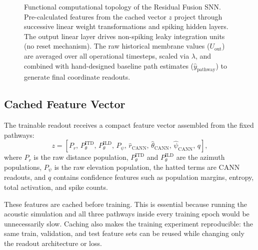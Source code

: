 \begin{figure}[htbp]
    \caption{Functional computational topology of the Residual Fusion SNN. Pre-calculated features from the cached vector $z$ project through successive linear weight transformations and spiking hidden layers. The output linear layer drives non-spiking leaky integration units (no reset mechanism). The raw historical membrane values ($U_{\text{out}}$) are averaged over all operational timesteps, scaled via $\lambda$, and combined with hand-designed baseline path estimates ($\hat{y}_{\text{pathway}}$) to generate final coordinate readouts.}
    \label{fig:fusion_snn_architecture}
\end{figure}

\subsection{Cached Feature Vector}

The trainable readout receives a compact feature vector assembled from the fixed pathways:
\begin{equation}
    z =
    \left[
    P_r,\,
    P^{\text{ITD}}_{\theta},\,
    P^{\text{ILD}}_{\theta},\,
    P_{\psi},\,
    \hat{r}_{\text{CANN}},\,
    \hat{{\theta}}_{\text{CANN}},\,
    \hat{{\psi}}_{\text{CANN}},\,
    q
    \right],
\end{equation}
where $P_r$ is the raw distance population, $P^{\text{ITD}}_{\theta}$ and $P^{\text{ILD}}_{\theta}$ are the azimuth populations, $P_{\psi}$ is the raw elevation population, the hatted terms are CANN readouts, and $q$ contains confidence features such as population margins, entropy, total activation, and spike counts.

These features are cached before training. This is essential because running the acoustic simulation and all three pathways inside every training epoch would be unnecessarily slow. Caching also makes the training experiment reproducible: the same train, validation, and test feature sets can be reused while changing only the readout architecture or loss.

